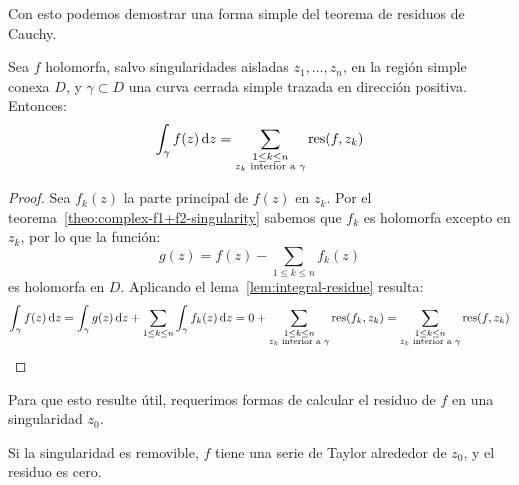   Con esto podemos demostrar una forma simple
  del teorema de residuos de Cauchy.
  \begin{theorem}
    \label{theo:Cauchy-residues}
    Sea \(f\) holomorfa,
    salvo singularidades aisladas \(z_1, \dotsc, z_n\),
    en la región simple conexa \(D\),
    y \(\gamma \subset D\) una curva cerrada simple
    trazada en dirección positiva.
    Entonces:
    \begin{equation}
      \label{eq:Cauchy-integral-residues}
      \int_\gamma f(z) \, \mathrm{d} z
	= \sum_{\substack{1 \le k \le n \\
			  \text{\(z_k\) interior a \(\gamma\)}}}
	    \operatorname{res}(f, z_k)
    \end{equation}
  \end{theorem}
  \begin{proof}
    Sea \(f_k(z)\) la parte principal de \(f(z)\) en \(z_k\).
    Por el teorema~\ref{theo:complex-f1+f2-singularity}
    sabemos que \(f_k\) es holomorfa excepto en \(z_k\),
    por lo que la función:
    \begin{equation*}
      g(z)
	= f(z) - \sum_{1 \le k \le n} f_k(z)
    \end{equation*}
    es holomorfa en \(D\).
    Aplicando el lema~\ref{lem:integral-residue} resulta:
    \begin{equation*}
      \int_\gamma f(z) \, \mathrm{d} z
	= \int_\gamma g(z) \, \mathrm{d} z
	    + \sum_{1 \le k \le n}
		\int_\gamma f_k(z) \, \mathrm{d} z
	= 0 + \sum_{\substack{1 \le k \le n \\
			  \text{\(z_k\) interior a \(\gamma\)}}}
		\operatorname{res}(f_k, z_k)
	= \sum_{\substack{1 \le k \le n \\
			  \text{\(z_k\) interior a \(\gamma\)}}}
	    \operatorname{res}(f, z_k)
    \qedhere
    \end{equation*}
  \end{proof}
  Para que esto resulte útil,
  requerimos formas de calcular el residuo de \(f\)
  en una singularidad \(z_0\).

  Si la singularidad es removible,
  \(f\) tiene una serie de Taylor alrededor de \(z_0\),%
  y el residuo es cero.

